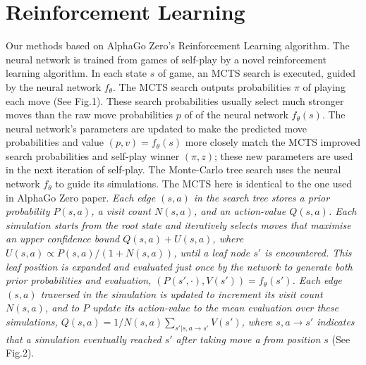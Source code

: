 \documentclass[12pt,a4paper]{report}
\begin{document}
\section{Reinforcement Learning}
\hspace{0.6cm}Our methods based on AlphaGo Zero's Reinforcement Learning algorithm. The neural network is trained from games of self-play by a novel reinforcement learning algorithm. 
In each state \(s\) of game, an MCTS search is executed, guided by the neural network \(f_\theta\). The MCTS search outputs probabilities \(\pi\) of playing each move (See Fig.1). These search probabilities usually select much stronger moves than the raw move probabilities \(p\) of of the neural network \(f_\theta(s)\). The neural network’s parameters are updated to make the predicted move probabilities and value \((p, v) = f_\theta(s)\) more closely match the MCTS improved search probabilities and self-play winner \((\pi, z)\); these new parameters are used in the next iteration of self-play. The Monte-Carlo tree search uses the neural network \(f_\theta\) to guide its simulations. The MCTS here is identical to the one used in AlphaGo Zero paper.
\textit{Each edge \((s, a)\) in the search tree stores a prior probability \(P(s, a)\), a visit count \(N(s, a)\), and an action-value \(Q(s, a)\). Each simulation starts from the root state and iteratively selects moves that maximise an upper confidence bound \(Q(s, a) + U(s, a)\), where \(U(s, a) \propto P(s, a)/(1 + N(s, a))\)\cite{AlphaGo}, until a leaf node \(s'\) is encountered. This leaf position is expanded and evaluated just once by the network to generate both prior probabilities and evaluation, \((P(s', ·), V(s')) = f_θ (s')\). Each edge \((s, a)\) traversed in the simulation is updated to increment its visit count \(N(s, a)\), and to \(P\) update its action-value to the mean evaluation over these simulations, \(Q(s, a) = 1/N(s, a) \sum_{s'|s,a\to s'}V(s')\), where \(s,a\to s'\) indicates that a simulation eventually reached \(s'\) after taking move a from position \(s\)} (See Fig.2).\par
\end{document}
